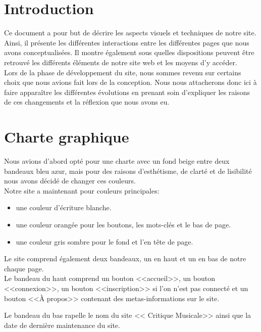 
\section{Introduction}

	\begin{paragraphe}
		Ce document a pour but de décrire les aspects visuels et techniques de notre site.\\
		Ainsi, il présente les différentes interactions entre les différentes pages que nous avons conceptualisées.
		Il montre également sous quelles dispositions peuvent être retrouvé les différents éléments de notre site web et les moyens d'y accéder.\\
		Lors de la phase de développement du site, nous sommes revenu sur certains choix que nous avions fait lors de la conception.
		Nous nous attacherons donc ici à faire apparaître les différentes évolutions en prenant soin d'expliquer les raisons de
		ces changements et la réflexion que nous avons eu.
	\end{paragraphe}

\section{Charte graphique}

	\begin{paragraphe}
	    Nous avions d'abord opté pour une charte avec un fond beige entre deux bandeaux bleu azur, mais pour des raisons
	    d'esthétisme, de clarté et de lisibilité nous avons décidé de changer ces couleurs.\\

		Notre site a maintenant pour couleurs principales:
            \begin{itemize}
            \item une couleur d'écriture blanche.
            \item une couleur orangée pour les boutons, les mots-clés et le bas de page.
            \item une couleur gris sombre pour le fond et l'en tête de page.
            \end{itemize}

	\end{paragraphe}

    \begin{paragraphe}
		Le site comprend également deux bandeaux, un en haut et un en bas de notre chaque page.\\
		Le bandeau du haut comprend un bouton <<accueil>>,
		un bouton <<connexion>>, un bouton <<inscription>> si l'on n'est pas connecté et un bouton <<À propos>> contenant des metas-informations sur le site.

        Le bandeau du bas rapelle le nom du site << Critique Musicale>> ainsi que la date de dernière maintenance du site.
	\end{paragraphe}

